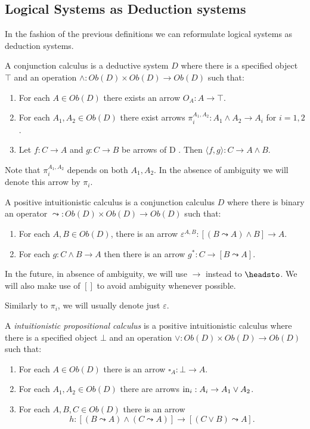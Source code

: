 \subsection{Logical Systems as Deduction systems}
In  the fashion of the previous definitions we can reformulate logical systems as deduction systems.
\begin{definition}
  A conjunction calculus is a deductive system $D$ where there is a specified object $\top$ and an operation $\land: Ob(D)\times Ob(D) \to Ob(D)$ such that:
  \begin{enumerate}
  \item For each $A\in Ob(D)$ there exists an arrow $O_A:A\to \top$.
  \item For each $A_1,A_2\in Ob(D)$ there exist arrows $\pi_i^{A_1,A_2}: A_1 \land A_2 \to A_i$ for $i=1,2$.
  \item Let $f:C\to A$ and $g:C\to B$ be arrows of D . Then $\langle f,g\rangle : C\to A\land B$.
  \end{enumerate}
\end{definition}

Note that $\pi_i^{A_1,A_2}$ depends on both $A_1,A_2$. In the absence of ambiguity we will denote this arrow by $\pi_i$.

\begin{definition} \label{def:positivecalculus}
  A positive intuitionistic calculus is a conjunction calculus $D$ where there is binary an operator $\leadsto: Ob(D)\times Ob(D) \to Ob(D)$ such that:
  \begin{enumerate}
  \item For each $A,B \in Ob(D)$, there is an arrow $\varepsilon^{A,B}: [(B \leadsto A) \land B]\to A$.
  \item For each $g:C\land B \to A$ then there is an arrow $g^*: C\to [B\leadsto A]$.
  \end{enumerate}
\end{definition}
\begin{remark}
  In the future, in absence of ambiguity, we will use $\to$ instead to $\headsto$. We will also make use of $[]$ to avoid ambiguity whenever possible.
\end{remark}
Similarly to $\pi_i$, we will usually denote just $\varepsilon$. 
\begin{definition}\label{def:intuipropcalculus}
  A \emph{intuitionistic propositional calculus} is a positive intuitionistic calculus where there is a specified object $\bot$ and an operation $\lor: Ob(D)\times Ob(D) \to Ob(D)$ such that:
  \begin{enumerate}
  \item For each $A\in Ob(D)$ there is an arrow $\square_A: \bot\to A$.
  \item For each $A_1,A_2\in Ob(D)$ there are arrows $\operatorname{in}_i: A_i\to A_1 \lor A_2 $.
  \item For each $A,B,C \in Ob(D)$ there is an arrow $$h:[(B\leadsto A)\land (C\leadsto A)] \to [(C\lor B)\leadsto A].$$
  \end{enumerate}
\end{definition}


